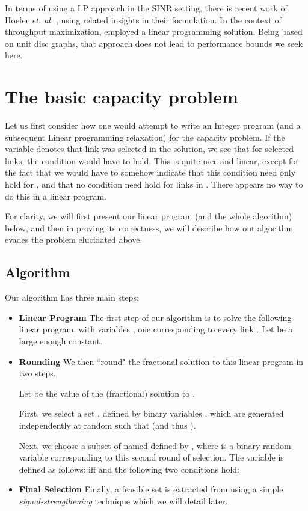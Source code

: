 \documentclass[11pt]{amsart}
\begin{document}
In terms of using a LP approach in the SINR setting, there is recent work of Hoefer \emph{et. al.} \cite{hoeferspaa}, using 
related insights in their formulation. In the context of throughput maximization, \cite{CKMPS08} employed a linear programming solution. Being based on unit disc graphs, that approach  does not lead to performance bounds we seek here.

\section{The basic capacity problem}

Let us first consider how one would attempt to write an Integer
program (and a subsequent Linear programming relaxation) for the
capacity problem. If the variable  denotes that
link  was selected in the solution, we see that for selected
links, the condition  would
have to hold. This is quite nice and linear, except for the fact that
we would have to somehow indicate that this condition need only hold
for , and that no condition need hold for
links in . There appears no way to do this
in a linear program. 


For clarity, we will first present our linear program (and the whole algorithm) below, and then in proving its correctness, we will
describe how out algorithm evades the problem elucidated above.

\subsection{Algorithm}
Our algorithm has three main steps:

\begin{itemize}
\item {\bf Linear Program}
The first step of our algorithm is to solve the following linear program, with variables , one corresponding to 
every link .
Let  be a large enough constant.


\item {\bf Rounding}
We then ``round" the fractional solution to this linear program in two steps.

Let  be the value of the (fractional) solution to .

First, we select a set , defined by binary variables , which are generated independently at random such that  (and thus ). 

Next, we choose a subset of  named  defined by ,
where  is a binary random variable
corresponding to this second round of selection.
The variable  is defined as follows:
 iff  and the following two conditions hold:


\item {\bf Final Selection}
Finally, a feasible set is extracted from  using a simple \emph{signal-strengthening} technique which we will detail later.
\end{itemize}
\end{document}
